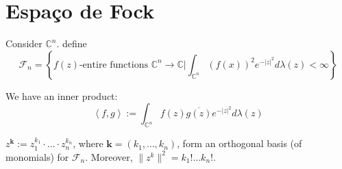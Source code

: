 \section{Espaço de Fock}


Consider $\mathbb{C}^{n}$. define
\[\mathcal{F}_n=\left\{\text{$f(z)$-entire functions  $\mathbb{C}^{n}\to \mathbb{C}$}\Big| \int_{\mathbb{C}^{n}}(f(x))^2e^{-|z|^2}d\lambda(z)<\infty\right\}\]

We have an inner product:
\[\left<f,g\right> :=\int_{\mathbb{C}^{n}}f(z)\overline{g(z)}e^{-|z|^2}d \lambda(z)\]

\clearpage
\begin{prop}\leavevmode
	$z^{\mathbf{k}}:=z_1^{k_1}\cdot\ldots\cdot z_n^{k_n}$, where $\mathbf{k}=(k_1,\ldots,k_n)$, form an orthogonal basis (of monomials) for $\mathcal{F}_n$. Moreover, $\|z^k\|^2=k_1!\ldots k_n!$.
\end{prop}
